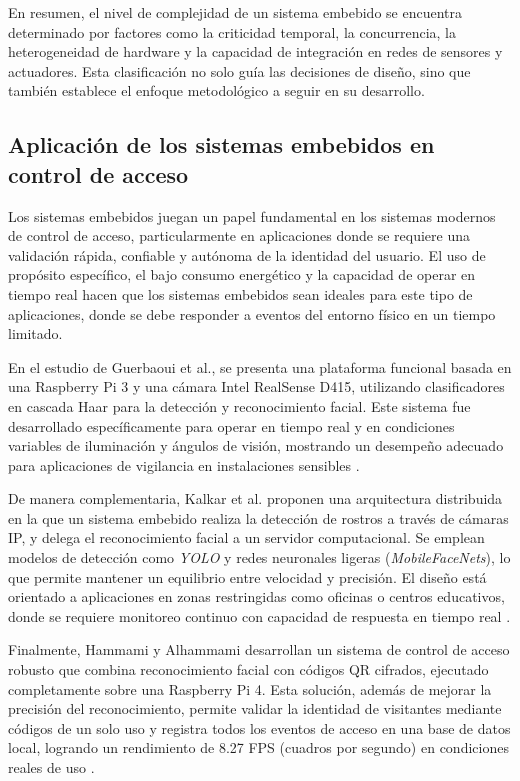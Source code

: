 En resumen, el nivel de complejidad de un sistema embebido se encuentra determinado por factores como la criticidad temporal, la concurrencia, la heterogeneidad de hardware y la capacidad de integración en redes de sensores y actuadores. Esta clasificación no solo guía las decisiones de diseño, sino que también establece el enfoque metodológico a seguir en su desarrollo.

\subsection{Aplicación de los sistemas embebidos en control de acceso}
Los sistemas embebidos juegan un papel fundamental en los sistemas modernos de control de acceso, particularmente en aplicaciones donde se requiere una validación rápida, confiable y autónoma de la identidad del usuario. El uso de propósito específico, el bajo consumo energético y la capacidad de operar en tiempo real hacen que los sistemas embebidos sean ideales para este tipo de aplicaciones, donde se debe responder a eventos del entorno físico en un tiempo limitado.

En el estudio de Guerbaoui et al., se presenta una plataforma funcional basada en una Raspberry Pi 3 y una cámara Intel RealSense D415, utilizando clasificadores en cascada Haar para la detección y reconocimiento facial. Este sistema fue desarrollado específicamente para operar en tiempo real y en condiciones variables de iluminación y ángulos de visión, mostrando un desempeño adecuado para aplicaciones de vigilancia en instalaciones sensibles \cite{guerbaoui_2025}.

De manera complementaria, Kalkar et al. proponen una arquitectura distribuida en la que un sistema embebido realiza la detección de rostros a través de cámaras IP, y delega el reconocimiento facial a un servidor computacional. Se emplean modelos de detección como \textit{YOLO} y redes neuronales ligeras (\textit{MobileFaceNets}), lo que permite mantener un equilibrio entre velocidad y precisión. El diseño está orientado a aplicaciones en zonas restringidas como oficinas o centros educativos, donde se requiere monitoreo continuo con capacidad de respuesta en tiempo real \cite{kalkar_2020}.

Finalmente, Hammami y Alhammami desarrollan un sistema de control de acceso robusto que combina reconocimiento facial con códigos QR cifrados, ejecutado completamente sobre una Raspberry Pi 4. Esta solución, además de mejorar la precisión del reconocimiento, permite validar la identidad de visitantes mediante códigos de un solo uso y registra todos los eventos de acceso en una base de datos local, logrando un rendimiento de 8.27 FPS (cuadros por segundo) en condiciones reales de uso \cite{hammami_2024}.

